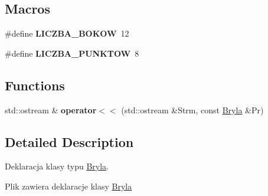 \subsection*{Macros}
\begin{DoxyCompactItemize}
\item 
\hypertarget{_bryla_8hh_a0f96e3ce9bab3bd512fb07a5e2a41912}{\#define {\bfseries L\+I\+C\+Z\+B\+A\+\_\+\+B\+O\+K\+O\+W}~12}\label{_bryla_8hh_a0f96e3ce9bab3bd512fb07a5e2a41912}

\item 
\hypertarget{_bryla_8hh_aeedd3cc6d1b0749386c0d3174d8aabd7}{\#define {\bfseries L\+I\+C\+Z\+B\+A\+\_\+\+P\+U\+N\+K\+T\+O\+W}~8}\label{_bryla_8hh_aeedd3cc6d1b0749386c0d3174d8aabd7}

\end{DoxyCompactItemize}
\subsection*{Functions}
\begin{DoxyCompactItemize}
\item 
\hypertarget{_bryla_8hh_a2faaa91188cb3ab8157ae93ce45a7058}{std\+::ostream \& {\bfseries operator$<$$<$} (std\+::ostream \&Strm, const \hyperlink{class_bryla}{Bryla} \&Pr)}\label{_bryla_8hh_a2faaa91188cb3ab8157ae93ce45a7058}

\end{DoxyCompactItemize}


\subsection{Detailed Description}
Deklaracja klasy typu \hyperlink{class_bryla}{Bryla}. 

Plik zawiera deklaracje klasy \hyperlink{class_bryla}{Bryla} 